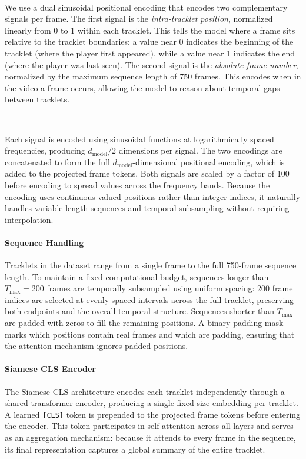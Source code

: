 \

We use a dual sinusoidal positional encoding that encodes two complementary signals per frame. The first signal is the \textit{intra-tracklet position}, normalized linearly from 0 to 1 within each tracklet. This tells the model where a frame sits relative to the tracklet boundaries: a value near 0 indicates the beginning of the tracklet (where the player first appeared), while a value near 1 indicates the end (where the player was last seen). The second signal is the \textit{absolute frame number}, normalized by the maximum sequence length of 750 frames. This encodes when in the video a frame occurs, allowing the model to reason about temporal gaps between tracklets.

\

Each signal is encoded using sinusoidal functions at logarithmically spaced frequencies, producing $d_{\text{model}}/2$ dimensions per signal. The two encodings are concatenated to form the full $d_{\text{model}}$-dimensional positional encoding, which is added to the projected frame tokens. Both signals are scaled by a factor of 100 before encoding to spread values across the frequency bands. Because the encoding uses continuous-valued positions rather than integer indices, it naturally handles variable-length sequences and temporal subsampling without requiring interpolation.


\paragraph{Sequence Handling}
Tracklets in the dataset range from a single frame to the full 750-frame sequence length. To maintain a fixed computational budget, sequences longer than $T_{\text{max}} = 200$ frames are temporally subsampled using uniform spacing: 200 frame indices are selected at evenly spaced intervals across the full tracklet, preserving both endpoints and the overall temporal structure. Sequences shorter than $T_{\text{max}}$ are padded with zeros to fill the remaining positions. A binary padding mask marks which positions contain real frames and which are padding, ensuring that the attention mechanism ignores padded positions.


\paragraph{Siamese CLS Encoder}\label{par:siamese_cls}
The Siamese CLS architecture encodes each tracklet independently through a shared transformer encoder, producing a single fixed-size embedding per tracklet. A learned \texttt{[CLS]} token is prepended to the projected frame tokens before entering the encoder. This token participates in self-attention across all layers and serves as an aggregation mechanism: because it attends to every frame in the sequence, its final representation captures a global summary of the entire tracklet.

